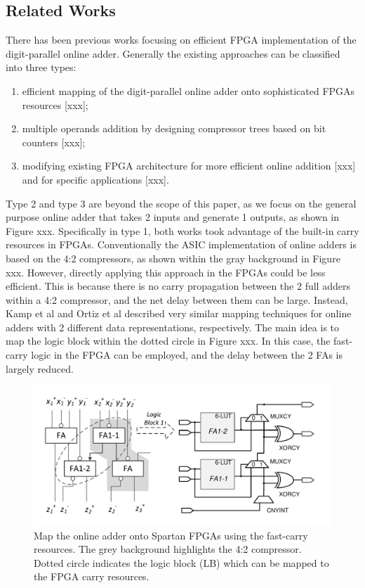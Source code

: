 \documentclass[conference]{IEEEtran}
\begin{document}
\subsection{Related Works}
There has been previous works focusing on efficient FPGA implementation of the digit-parallel online adder. Generally the existing approaches can be classified into three types:%
\begin{enumerate}
	\item efficient mapping of the digit-parallel online adder onto sophisticated FPGAs resources [xxx];
	\item multiple operands addition by designing compressor trees based on bit counters [xxx];
	\item modifying existing FPGA architecture for more efficient online addition [xxx] and for specific applications [xxx].
\end{enumerate}

Type 2 and type 3 are beyond the scope of this paper, as we focus on the general purpose online adder that takes 2 inputs and generate 1 outputs, as shown in Figure xxx. Specifically in type 1, both works took advantage of the built-in carry resources in FPGAs. Conventionally the ASIC implementation of online adders is based on the 4:2 compressors, as shown within the gray background in Figure xxx. However, directly applying this approach in the FPGAs could be less efficient. This is because there is no carry propagation between the 2 full adders within a 4:2 compressor, and the net delay between them can be large. Instead, Kamp et al and Ortiz et al described very similar mapping techniques for online adders with 2 different data representations, respectively. The main idea is to map the logic block within the dotted circle in Figure xxx. In this case, the fast-carry logic in the FPGA can be employed, and the delay between the 2 FAs is largely reduced. 

\begin{figure}[htbp]
	\centering
	\includegraphics[width=.5\textwidth]{./Figures/SDAdder_42comp_Spartan.pdf}
	\caption{Map the online adder onto Spartan FPGAs using the fast-carry resources. The grey background highlights the 4:2 compressor. Dotted circle indicates the logic block (LB) which can be mapped to the FPGA carry resources.}
\end{figure}
\end{document}
